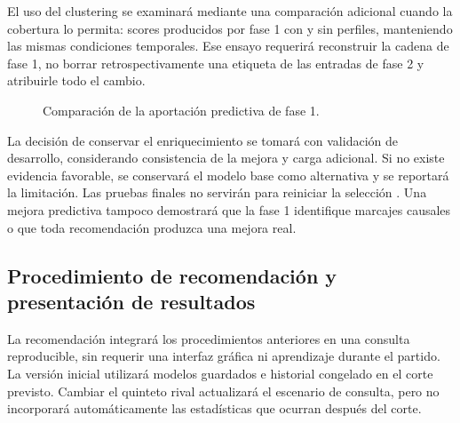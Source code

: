 El uso del clustering se examinará mediante una comparación adicional cuando la cobertura lo permita: scores producidos por fase 1 con y sin perfiles, manteniendo las mismas condiciones temporales. Ese ensayo requerirá reconstruir la cadena de fase 1, no borrar retrospectivamente una etiqueta de las entradas de fase 2 y atribuirle todo el cambio.

\begin{figure}[htbp]
\centering
{}
\caption{Comparación de la aportación predictiva de fase 1.}
\end{figure}

La decisión de conservar el enriquecimiento se tomará con validación de desarrollo, considerando consistencia de la mejora y carga adicional. Si no existe evidencia favorable, se conservará el modelo base como alternativa y se reportará la limitación. Las pruebas finales no servirán para reiniciar la selección \cite{cawley2010selection}. Una mejora predictiva tampoco demostrará que la fase 1 identifique marcajes causales o que toda recomendación produzca una mejora real.

\subsection{Procedimiento de recomendación y presentación de resultados}
\label{subsec:recomendacion-fase2}
La recomendación integrará los procedimientos anteriores en una consulta reproducible, sin requerir una interfaz gráfica ni aprendizaje durante el partido. La versión inicial utilizará modelos guardados e historial congelado en el corte previsto. Cambiar el quinteto rival actualizará el escenario de consulta, pero no incorporará automáticamente las estadísticas que ocurran después del corte.

